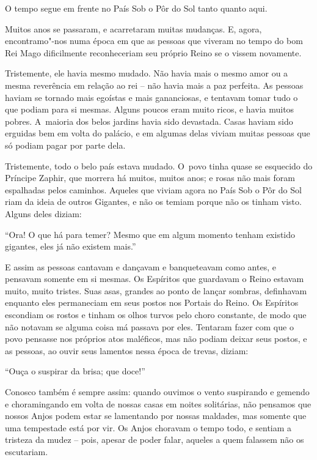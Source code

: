  

O tempo segue em frente no País Sob o Pôr do Sol tanto quanto aqui.

Muitos anos se passaram, e acarretaram muitas mudanças. E, agora,
encontramo"-nos numa época em que as pessoas que viveram no tempo do bom
Rei Mago dificilmente reconheceriam seu próprio Reino se o vissem
novamente.

Tristemente, ele havia mesmo mudado. Não havia mais o mesmo amor ou a
mesma reverência em relação ao rei -- não havia mais a paz perfeita. As
pessoas haviam se tornado mais egoístas e mais gananciosas, e tentavam
tomar tudo o que podiam para si mesmas. Alguns poucos eram muito ricos,
e havia muitos pobres. A~maioria dos belos jardins havia sido devastada.
Casas haviam sido erguidas bem em volta do palácio, e em algumas delas
viviam muitas pessoas que só podiam pagar por parte dela.

Tristemente, todo o belo país estava mudado. O~povo tinha quase se
esquecido do Príncipe Zaphir, que morrera há muitos, muitos anos; e
rosas não mais foram espalhadas pelos caminhos. Aqueles que viviam agora
no País Sob o Pôr do Sol riam da ideia de outros Gigantes, e não os
temiam porque não os tinham visto. Alguns deles diziam:

``Ora! O que há para temer? Mesmo que em algum momento tenham existido
gigantes, eles já não existem mais.''

E assim as pessoas cantavam e dançavam e banqueteavam como antes, e
pensavam somente em si mesmas. Os Espíritos que guardavam o Reino
estavam muito, muito tristes. Suas asas, grandes ao ponto de lançar
sombras, definhavam enquanto eles permaneciam em seus postos nos Portais
do Reino. Os Espíritos escondiam os rostos e tinham os olhos turvos pelo
choro constante, de modo que não notavam se alguma coisa má passava
por eles. Tentaram fazer com que o povo pensasse nos próprios atos
maléficos, mas não podiam deixar seus postos, e as pessoas, ao ouvir
seus lamentos nessa época de trevas, diziam:

``Ouça o suspirar da brisa; que doce!''

Conosco também é sempre assim: quando ouvimos o vento suspirando e
gemendo e choramingando em volta de nossas casas em noites solitárias,
não pensamos que nossos Anjos podem estar se lamentando por nossas
maldades, mas somente que uma tempestade está por vir. Os Anjos choravam
o tempo todo, e sentiam a tristeza da mudez -- pois, apesar de poder
falar, aqueles a quem falassem não os escutariam.


